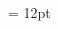\documentclass[gps1,twoside]{article}
\begin{document}
\setlength\columnseprule{0.4pt} 
\begin{multicols}{2}\begin{spacing}{0.458333333333333}{\raggedright} \begin{spacing}{0.458333333333333}
\hangindent= 12pt
  \\ \headwordggoTeluINentryletDatadicBody{}\spanenpronunciationggofonipaxemicpronunciationsentryletDatadicBody{[}\spanenpronunciationggofonipaxemicpronunciationsentryletDatadicBody{]}  \grammaticalinfosensesensesentryletDatadicBody{} \end{spacing}
 \end{spacing}\end{multicols}
\end{document}
